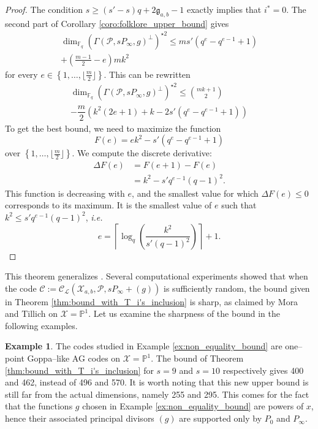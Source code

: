 \documentclass[lettersize,journal]{IEEEtran}
\theoremstyle{plain}
\theoremstyle{definition}
\newtheorem{example}[thm]{Example}
\theoremstyle{remark}
\newcommand{\calP}{\mathcal{P}}
\newcommand{\calL}{\mathcal{L}}
\newcommand{\calC}{\mathcal{C}}
\newcommand{\calX}{\mathcal{X}}
\newcommand{\fq}{\mathbb{F}_{q}}
\newcommand{\PP}{\mathbb{P}}
\newcommand{\set}[1]{\left\{#1\right\}}
\begin{document}
	\begin{proof}
		The condition $s \geq (s'-s)q+2\mathfrak{g}_{a,b}-1$ exactly implies that $i^*=0$. The second part of Corollary \ref{coro:folklore_upper_bound} gives
		\begin{multline*}
				\dim_{\fq} (\Gamma(\calP,sP_\infty,g)^{\perp})^{\star 2} \leq ms'(q^e-q^{e-1}+1) \\+ \left( \frac{m-1}{2} -e \right)mk^2
		\end{multline*}
	for every $e \in \set{1,\dots,\lfloor \frac{m}{2} \rfloor}$. This can be rewritten 
			\begin{multline*}
		\dim_{\fq} (\Gamma(\calP,sP_\infty,g)^{\perp})^{\star 2} \leq \binom{mk+1}{2} \\- \dfrac{m}{2}\left(k^2(2e+1)+k-2s'(q^e-q^{e-1}+1)\right)
	\end{multline*} 
		To get the best bound, we need to maximize the function
		$$F(e) = ek^2-s'(q^e-q^{e-1}+1)$$
		over $\set{1,\dots,\lfloor \frac{m}{2} \rfloor}$.
		We compute the discrete derivative:
		\begin{align*}
			\Delta F(e) &= F(e+1)-F(e) \\
			&= k^2 - s'q^{e-1}(q-1)^2.
		\end{align*}
		This function is decreasing with $e$, and the smallest value for which $\Delta F(e) \leq 0$ corresponds to its maximum. It is the smallest value of $e$ such that $k^2 \leq s'q^{e-1}(q-1)^2$, \emph{i.e.}
		$$e =  \left\lceil \log_q\left(\dfrac{k^2}{s'(q-1)^2}\right)\right\rceil+1.$$
	\end{proof}
	
	This theorem generalizes \cite[Corollary 27]{MT21}. Several computational experiments showed that when the code $\calC:=\calC_{\calL}(\calX_{a,b},\calP,sP_\infty+(g))$ is sufficiently random, the bound given in Theorem \ref{thm:bound_with_T_i's_inclusion} is sharp, as claimed by Mora and Tillich \cite[Remark 28]{MT21} on ${\calX=\PP^1}$. Let us examine the sharpness of the bound in the following examples.
	
	\begin{example}\label{ex:comp}
		The codes studied in Example \ref{ex:non_equality_bound} are one--point Goppa--like AG codes on ${\calX=\PP^1}$. The bound of Theorem \ref{thm:bound_with_T_i's_inclusion} for $s=9$ and $s=10$ respectively gives 400 and 462, instead of 496 and 570. It is worth noting that this new upper bound is still far from the actual dimensions, namely 255 and 295. This comes for the fact that the functions $g$ chosen in Example \ref{ex:non_equality_bound} are powers of $x$, hence their associated principal divisors $(g)$ are supported only by $P_0$ and $P_\infty$.
	\end{example}
	
\end{document}
